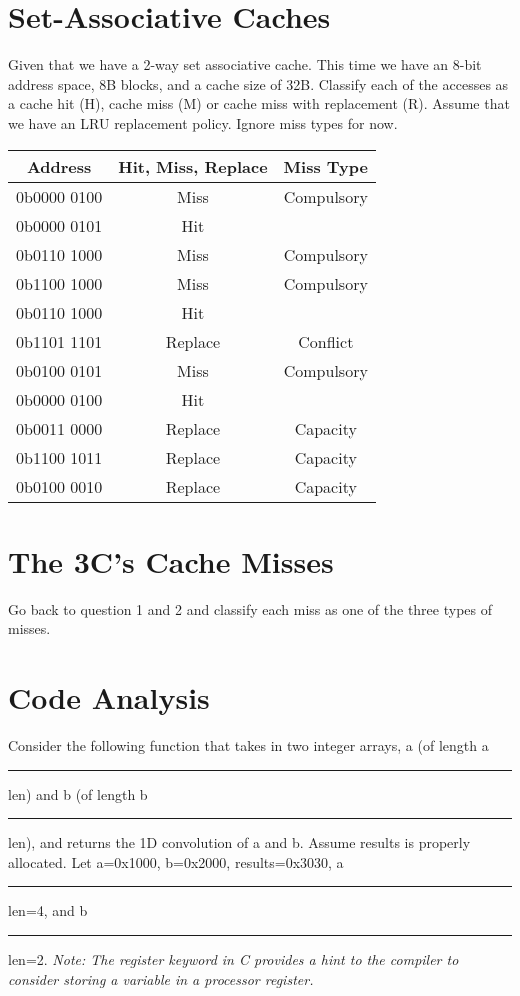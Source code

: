 \documentclass{article}
\begin{document}
\section{Set-Associative Caches}
Given that we have a 2-way set associative cache. This time we have an 8-bit address space, 8B blocks, and a cache size of 32B. Classify each of the accesses as a cache hit (H), cache miss (M) or cache miss with replacement (R). Assume that we have an LRU replacement policy. Ignore miss types for now.\\
\begin{table}[H]
    \centering
    \ttfamily
    \begin{tabular}{|c|c|c|}
        \hline
        Address     & Hit, Miss, Replace & Miss Type  \\ \hline
        0b0000 0100 & Miss               & Compulsory \\ \hline
        0b0000 0101 & Hit                &            \\ \hline
        0b0110 1000 & Miss               & Compulsory \\ \hline
        0b1100 1000 & Miss               & Compulsory \\ \hline
        0b0110 1000 & Hit                &            \\ \hline
        0b1101 1101 & Replace            & Conflict   \\ \hline
        0b0100 0101 & Miss               & Compulsory \\ \hline
        0b0000 0100 & Hit                &            \\ \hline
        0b0011 0000 & Replace            & Capacity   \\ \hline
        0b1100 1011 & Replace            & Capacity   \\ \hline
        0b0100 0010 & Replace            & Capacity   \\ \hline
    \end{tabular}
\end{table}

\section{The 3C's Cache Misses}
Go back to question 1 and 2 and classify each miss as one of the three types of misses.\\

\section{Code Analysis}
Consider the following function that takes in two integer arrays, a (of length a\rule{0.2cm}{0.4pt}len) and b (of length b\rule{0.2cm}{0.4pt}len), and returns the 1D convolution of a and b. Assume results is properly allocated.
Let a=0x1000, b=0x2000, results=0x3030, a\rule{0.2cm}{0.4pt}len=4, and b\rule{0.2cm}{0.4pt}len=2. \textit{Note: The register keyword in C provides a hint to the compiler to consider storing a variable in a processor register. }
\end{document}

